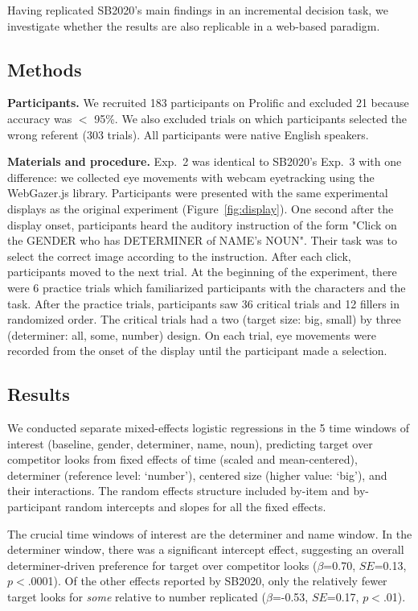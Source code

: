 \documentclass[10pt,letterpaper]{article}
\newcommand{\figref}[1]{Figure~\ref{#1}}
\newcommand{\expref}[1]{Exp.~#1}
\begin{document}
Having replicated SB2020's main findings in an incremental decision task, we investigate whether the results are also replicable in a web-based paradigm.

\subsection{Methods}

\textbf{Participants.} We recruited 183 participants on Prolific and excluded 21  because  accuracy was $<$ 95\%. We also excluded trials on which participants selected the wrong referent (303 trials). All participants were native English speakers.


\textbf{Materials and procedure.} \expref{2} was identical to SB2020's \expref{3} with one difference: we collected eye movements with webcam eyetracking using the WebGazer.js \cite{papoutsaki2016webgazer} library. Participants were presented with the same experimental displays as the original experiment (\figref{fig:display}). One second after the display onset, participants heard the auditory instruction of the form "Click on the GENDER who has DETERMINER of NAME's NOUN". Their task was to select the correct image according to the instruction. After each click, participants moved to the next trial. At the beginning of the experiment, there were 6 practice trials which familiarized participants with the characters and the task. After the practice trials, participants saw 36 critical trials and 12 fillers in randomized order. The critical trials had a two (target size: big, small) by three (determiner: all, some, number) design. On each trial, eye movements were recorded from the onset of the display until the participant made a selection.


\subsection{Results}

We conducted separate mixed-effects logistic regressions in the 5 time windows of interest (baseline, gender, determiner, name, noun), predicting target over competitor looks from fixed effects of time (scaled and mean-centered), determiner (reference level: `number'), centered size (higher value: `big'), and their interactions. The random effects structure included by-item and by-participant random intercepts and slopes for all the fixed effects.

The crucial time windows of interest are the determiner and name window. In the determiner window, there was a significant intercept effect, suggesting an overall determiner-driven preference for target over competitor looks ($\beta$=0.70, $SE$=0.13, $p<$.0001). Of the other effects reported by SB2020, only the relatively fewer target looks for \emph{some} relative to number replicated  ($\beta$=-0.53, $SE$=0.17, $p<$.01).
\end{document}
